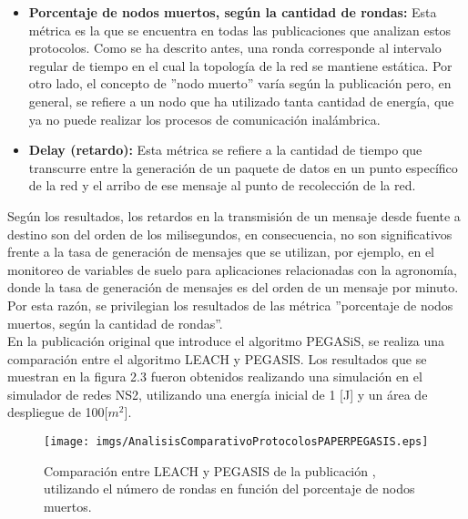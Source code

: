 \begin{itemize}
\item \textbf{Porcentaje de nodos muertos, según la cantidad de rondas:} Esta métrica es la que se encuentra en todas las publicaciones que analizan estos protocolos. Como se ha descrito antes, una ronda corresponde al intervalo regular de tiempo en el cual la topología de la red se mantiene estática. Por otro lado, el concepto de ''nodo muerto'' varía según la publicación pero, en general, se refiere a un nodo que ha utilizado tanta cantidad de energía, que ya no puede realizar los procesos de comunicación inalámbrica.

\item \textbf{Delay (retardo):} Esta métrica se refiere a la cantidad de tiempo que transcurre entre la generación de un paquete de datos en un punto específico de la red y el arribo de ese mensaje al punto de recolección de la red.

\end{itemize}

Según los resultados, los retardos en la transmisión de un mensaje desde fuente a destino son del orden de los milisegundos, en consecuencia, no son significativos frente a la tasa de generación de mensajes que se utilizan, por ejemplo, en el monitoreo de variables de suelo para aplicaciones relacionadas con la agronomía, donde la tasa de generación de mensajes es del orden de un mensaje por minuto. Por esta razón, se privilegian los resultados de las métrica ''porcentaje de nodos muertos, según la cantidad de rondas''.\\

En la publicación original que introduce el algoritmo PEGASiS, se realiza una comparación entre el algoritmo LEACH y PEGASIS. Los resultados que se muestran en la figura 2.3 fueron obtenidos realizando una simulación en el simulador de redes NS2, utilizando una energía inicial de 1 [J] y un área de despliegue de 100[$m^2$].

\begin{center}
\begin{figure}[H]
\centering
\texttt{[image: imgs/AnalisisComparativoProtocolosPAPERPEGASIS.eps]}
\caption{Comparación entre LEACH y PEGASIS de la publicación \cite{PegasysOriginal}, utilizando el número de rondas en función del porcentaje de nodos muertos.}
\end{figure}
\end{center}

